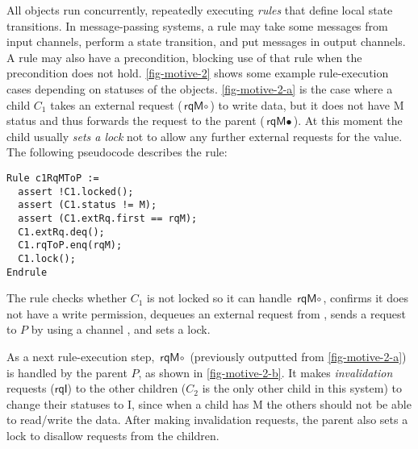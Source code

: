 All objects run concurrently, repeatedly executing \emph{rules} that define local state transitions.
In message-passing systems, a rule may take some messages from input channels, perform a state transition, and put messages in output channels.
A rule may also have a precondition, blocking use of that rule when the precondition does not hold.
\autoref{fig-motive-2} shows some example rule-execution cases depending on statuses of the objects.
\autoref{fig-motive-2-a} is the case where a child $C_1$ takes an external request ($\textsf{rqM}\circ$) to write data, but it does not have M status and thus forwards the request to the parent ($\textsf{rqM}\bullet$).
At this moment the child usually \emph{sets a lock} not to allow any further external requests for the value.
The following pseudocode describes the rule:
\begin{lstlisting}
Rule c1RqMToP :=
  assert !C1.locked();
  assert (C1.status != M);
  assert (C1.extRq.first == rqM);
  C1.extRq.deq();
  C1.rqToP.enq(rqM);
  C1.lock();
Endrule
\end{lstlisting}
The rule checks whether $C_1$ is not locked so it can handle $\textsf{rqM}\circ$, confirms it does not have a write permission, dequeues an external request from , sends a request to $P$ by using a channel , and sets a lock.

As a next rule-execution step, $\textsf{rqM}\circ$ (previously outputted from \autoref{fig-motive-2-a}) is handled by the parent $P$, as shown in \autoref{fig-motive-2-b}.
It makes \emph{invalidation} requests ($\textsf{rqI}$) to the other children ($C_2$ is the only other child in this system) to change their statuses to I, since when a child has M the others should not be able to read/write the data.
After making invalidation requests, the parent also sets a lock to disallow requests from the children.

